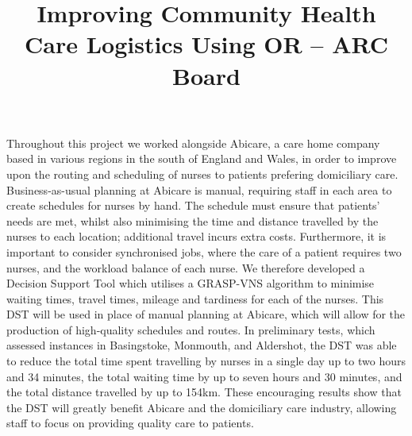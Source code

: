 \documentclass[a4paper]{article}
\begin{document}
\title{Improving Community Health Care Logistics Using OR -- ARC Board}
\date{}
\maketitle

\noindent Throughout this project we worked alongside Abicare, a care home company based in various regions in the south of England and Wales, in order to improve upon the routing and scheduling of nurses to patients prefering domiciliary care. Business-as-usual planning at Abicare is manual, requiring staff in each area to create schedules for nurses by hand. The schedule must ensure that patients' needs are met, whilst also minimising the time and distance travelled by the nurses to each location; additional travel incurs extra costs. Furthermore, it is important to consider synchronised jobs, where the care of a patient requires two nurses, and the workload balance of each nurse. We therefore developed a Decision Support Tool which utilises a GRASP-VNS algorithm to minimise waiting times, travel times, mileage and tardiness for each of the nurses. This DST will be used in place of manual planning at Abicare, which will allow for the production of high-quality schedules and routes. In preliminary tests, which assessed instances in Basingstoke, Monmouth, and Aldershot, the DST was able to reduce the total time spent travelling by nurses in a single day up to two hours and 34 minutes, the total waiting time by up to seven hours and 30 minutes, and the total distance travelled by up to 154km. These encouraging results show that the DST will greatly benefit Abicare and the domiciliary care industry, allowing staff to focus on providing quality care to patients. 
\end{document}
